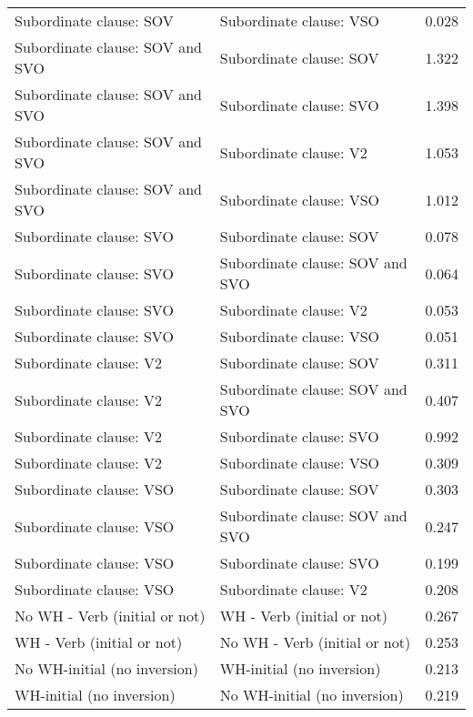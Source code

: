 \begin{longtable}{p{.4\linewidth}p{.4\linewidth}p{.1\linewidth}}
Subordinate clause: SOV & Subordinate clause: VSO & 0.028\\
Subordinate clause: SOV and SVO & Subordinate clause: SOV & 1.322\\
Subordinate clause: SOV and SVO & Subordinate clause: SVO & 1.398\\
Subordinate clause: SOV and SVO & Subordinate clause: V2 & 1.053\\
Subordinate clause: SOV and SVO & Subordinate clause: VSO & 1.012\\
Subordinate clause: SVO & Subordinate clause: SOV & 0.078\\
Subordinate clause: SVO & Subordinate clause: SOV and SVO & 0.064\\
Subordinate clause: SVO & Subordinate clause: V2 & 0.053\\
Subordinate clause: SVO & Subordinate clause: VSO & 0.051\\
Subordinate clause: V2 & Subordinate clause: SOV & 0.311\\
Subordinate clause: V2 & Subordinate clause: SOV and SVO & 0.407\\
Subordinate clause: V2 & Subordinate clause: SVO & 0.992\\
Subordinate clause: V2 & Subordinate clause: VSO & 0.309\\
Subordinate clause: VSO & Subordinate clause: SOV & 0.303\\
Subordinate clause: VSO & Subordinate clause: SOV and SVO & 0.247\\
Subordinate clause: VSO & Subordinate clause: SVO & 0.199\\
Subordinate clause: VSO & Subordinate clause: V2 & 0.208\\
No WH - Verb (initial or not) & WH - Verb (initial or not) & 0.267\\
WH - Verb (initial or not) & No WH - Verb (initial or not) & 0.253\\
No WH-initial (no inversion) & WH-initial (no inversion) & 0.213\\
WH-initial (no inversion) & No WH-initial (no inversion) & 0.219\\
\end{longtable}